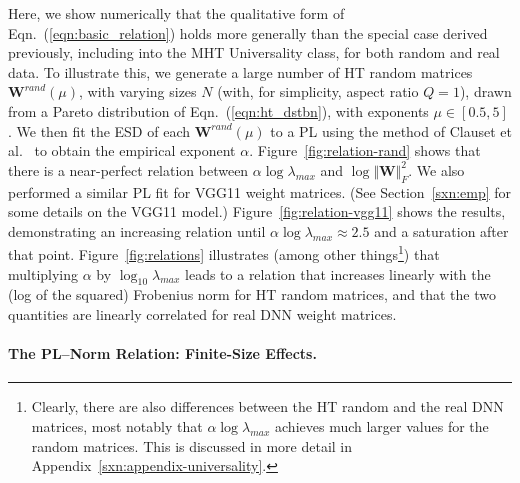 Here, we show numerically that the qualitative form of Eqn.~(\ref{eqn:basic_relation}) holds more generally than the special case derived previously, including into the MHT Universality class, for both random and real data.
To illustrate this, we generate a large number of HT random matrices $\mathbf{W}^{rand}(\mu)$, with varying sizes $N$ (with, for simplicity, aspect ratio $Q=1$), drawn from a Pareto distribution of Eqn.~(\ref{eqn:ht_dstbn}), with exponents $\mu\in[0.5, 5]$.
We then fit the ESD of each $\mathbf{W}^{rand}(\mu)$ to a PL using the method of Clauset et al.~\cite{CSN09_powerlaw,ABP14} to obtain the empirical exponent $\alpha$.   
Figure~\ref{fig:relation-rand} shows that there is a near-perfect relation between $ \alpha\log\lambda_{max}$ and $\log\Vert\mathbf{W}\Vert^{2}_{F} $.
We also performed a similar PL fit for VGG11 weight matrices.
(See Section~\ref{sxn:emp} for some details on the VGG11 model.)
Figure~\ref{fig:relation-vgg11} shows the results, demonstrating an increasing relation until $ \alpha\log\lambda_{max} \approx 2.5$ and a saturation after that point.
Figure~\ref{fig:relations} illustrates
(among other things\footnote{Clearly, there are also differences between the HT random and the real DNN matrices, most notably that $ \alpha\log\lambda_{max} $ achieves much larger values for the random matrices.  This is discussed in more detail in Appendix~\ref{sxn:appendix-universality}.})
that multiplying $\alpha$ by $\log_{10}\lambda_{max}$ leads to a relation that increases linearly with the (log of the squared) Frobenius norm for HT random matrices, and that the two quantities are linearly correlated for real DNN weight matrices.



\paragraph{The PL--Norm Relation: Finite-Size Effects.}


